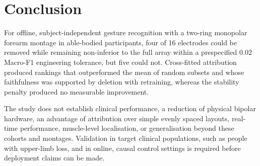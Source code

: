 \section{Conclusion}
\label{sec:conclusion}

For offline, subject-independent gesture recognition with a two-ring monopolar forearm montage in able-bodied participants, four of 16 electrodes could be removed while remaining non-inferior to the full array within a prespecified 0.02 Macro-F1 engineering tolerance, but five could not. Cross-fitted attribution produced rankings that outperformed the mean of random subsets and whose faithfulness was supported by deletion with retraining, whereas the stability penalty produced no measurable improvement.

The study does not establish clinical performance, a reduction of physical bipolar hardware, an advantage of attribution over simple evenly spaced layouts, real-time performance, muscle-level localisation, or generalisation beyond these cohorts and montages. Validation in target clinical populations, such as people with upper-limb loss, and in online, causal control settings is required before deployment claims can be made.
